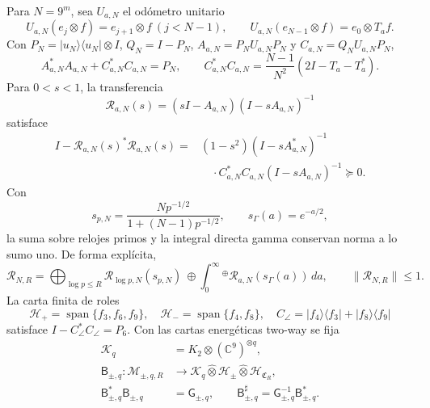 Para \(N=9^m\), sea \(U_{a,N}\) el odómetro unitario
\[
 U_{a,N}(e_j\otimes f)=e_{j+1}\otimes f\ (j<N-1),
 \qquad U_{a,N}(e_{N-1}\otimes f)=e_0\otimes T_af.
\]
Con \(P_N=|u_N\rangle\langle u_N|\otimes I\), \(Q_N=I-P_N\),
\(A_{a,N}=P_NU_{a,N}P_N\) y \(C_{a,N}=Q_NU_{a,N}P_N\),
\begin{equation}\label{eq:pdf2-rh-source-energia}
 A_{a,N}^*A_{a,N}+C_{a,N}^*C_{a,N}=P_N,
 \qquad
 C_{a,N}^*C_{a,N}
 =\frac{N-1}{N^2}(2I-T_a-T_a^*).
\end{equation}
Para \(0<s<1\), la transferencia
\begin{equation}\label{eq:pdf2-rh-source-redheffer}
 \mathscr R_{a,N}(s)=(sI-A_{a,N})(I-sA_{a,N})^{-1}
\end{equation}
satisface
\begin{equation}\label{eq:pdf2-rh-source-defecto}
\begin{aligned}
 I-\mathscr R_{a,N}(s)^*\mathscr R_{a,N}(s)
 ={}&(1-s^2)(I-sA_{a,N}^*)^{-1}\\
 &\quad\cdot C_{a,N}^*C_{a,N}(I-sA_{a,N})^{-1}\succeq0.
\end{aligned}
\end{equation}
Con
\[
 s_{p,N}=\frac{Np^{-1/2}}{1+(N-1)p^{-1/2}},
 \qquad s_\Gamma(a)=e^{-a/2},
\]
la suma sobre relojes primos y la integral directa gamma conservan norma a lo
sumo uno. De forma explícita,
\begin{equation}\label{eq:pdf2-rh-source-relojes}
 \mathscr R_{N,R}
 =\bigoplus_{\log p\leq R}
   \mathscr R_{\log p,N}(s_{p,N})
 \ \oplus\!
 \int_0^\infty{}^\oplus
   \mathscr R_{a,N}(s_\Gamma(a))\,da,
 \qquad \|\mathscr R_{N,R}\|\leq1.
\end{equation}
La carta finita de roles
\[
 \mathcal H_+=\operatorname{span}\{f_3,f_6,f_9\},\quad
 \mathcal H_-=\operatorname{span}\{f_4,f_8\},\quad
 C_\angle=|f_4\rangle\langle f_3|+|f_8\rangle\langle f_9|
\]
satisface \(I-C_\angle^*C_\angle=P_6\). Con las cartas energéticas
two-way se fija
\begin{equation}\label{eq:pdf2-rh-source-cartas}
\begin{aligned}
 \mathcal K_q&=K_2\otimes(\mathbb C^9)^{\otimes q},\\
 \mathsf B_{\pm,q}:\mathcal M_{\pm,q,R}
 &\longrightarrow
 \mathcal K_q\widehat\otimes\mathcal H_\pm
 \widehat\otimes\mathcal H_{\mathfrak C_R},\\
 \mathsf B_{\pm,q}^*\mathsf B_{\pm,q}&=\mathsf G_{\pm,q},
 \qquad
 \mathsf B_{\pm,q}^{\sharp}
 =\mathsf G_{\pm,q}^{-1}\mathsf B_{\pm,q}^*.
\end{aligned}
\end{equation}
